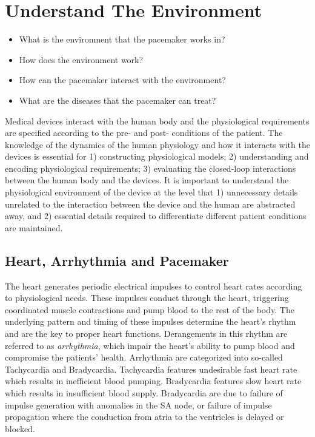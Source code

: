 \documentclass[openany]{now} %
\begin{document}
\chapter{Understand The Environment}
\begin{itemize}
	\item What is the environment that the pacemaker works in?
    \item How does the environment work?
    \item How can the pacemaker interact with the environment?
    \item What are the diseases that the pacemaker can treat?
\end{itemize}

Medical devices interact with the human body and the physiological requirements are specified according to the pre- and post- conditions of the patient. The knowledge of the dynamics of the human physiology and how it interacts with the devices is essential for 1) constructing physiological models; 2) understanding and encoding physiological requirements; 3) evaluating the closed-loop interactions between the human body and the devices. It is important to understand the physiological environment of the device at the level that 1) unnecessary details unrelated to the interaction between the device and the human are abstracted away, and 2) essential details required to differentiate different patient conditions are maintained.

\section{Heart, Arrhythmia and Pacemaker}
The heart generates periodic electrical impulses to control heart rates according to physiological needs. These impulses conduct through the heart, triggering coordinated muscle contractions and pump blood to the rest of the body. The underlying pattern and timing of these impulses determine the heart's rhythm and are the key to proper heart functions. Derangements in this rhythm are referred to as \emph{arrhythmia}, which impair the heart's ability to pump blood and compromise the patients' health. Arrhythmia are categorized into so-called \textsf{Tachycardia} and \textsf{Bradycardia}. Tachycardia features undesirable fast heart rate which results in inefficient blood pumping. Bradycardia features slow heart rate which results in insufficient blood supply. Bradycardia are due to failure of impulse generation with anomalies in the SA node, or failure of impulse propagation where the conduction from atria to the ventricles is delayed or blocked. 
\end{document}
